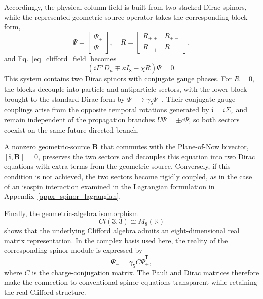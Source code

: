 Accordingly, the physical column field is built from two stacked Dirac spinors, while the represented geometric-source operator takes the corresponding block form,
\begin{equation}
    \Psi = \begin{bmatrix}\Psi_{+} \\ \Psi_{-}\end{bmatrix},\quad R = \begin{bmatrix}R_{++} & R_{+-} \\ R_{-+} & R_{--}\end{bmatrix},
\end{equation}
and Eq.~\eqref{eq_clifford_field} becomes
\begin{equation}\label{eq_fundamental_matrix}
    \left(i\Gamma^{\mu}D_{\mu} \mp \kappa I_{8} - \chi R\right)\Psi = 0.
\end{equation}
This system contains two Dirac spinors with conjugate gauge phases. For $R = 0$, the blocks decouple into particle and antiparticle sectors, with the lower block brought to the standard Dirac form by $\Psi_{-} \mapsto \gamma_{5}\Psi_{-}$. Their conjugate gauge couplings arise from the opposite temporal rotations generated by $\mathfrak{i} = i\Sigma_{z}$ and remain independent of the propagation branches $U\Psi = \pm c\Psi$, so both sectors coexist on the same future-directed branch.

A nonzero geometric-source $\mathbf{R}$ that commutes with the Plane-of-Now bivector, $[\mathbf{i},\mathbf{R}]=0$, preserves the two sectors and decouples this equation into two Dirac equations with extra terms from the geometric-source. Conversely, if this condition is not achieved, the two sectors become rigidly coupled, as in the case of an isospin interaction examined in the Lagrangian formulation in Appendix~\ref{appx_spinor_lagrangian}.

Finally, the geometric-algebra isomorphism
\begin{equation}
    Cl(3,3) \cong M_{8}(\mathbb{R})
\end{equation}
shows that the underlying Clifford algebra admits an eight-dimensional real matrix representation. In the complex basis used here, the reality of the corresponding spinor module is expressed by
\begin{equation}
    \Psi_{-}=\gamma_{5}C\bar{\Psi}_{+}^{\mathsf T},
\end{equation}
where $C$ is the charge-conjugation matrix. The Pauli and Dirac matrices therefore make the connection to conventional spinor equations transparent while retaining the real Clifford structure.

